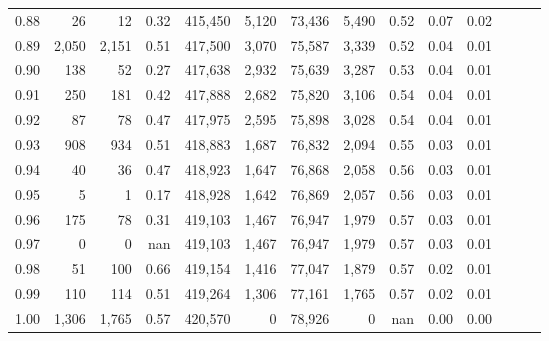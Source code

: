 \begin{tabular}{rrrrrrrrrrrrrr}
0.88 &      26 &     12 &  0.32 &  415,450 &    5,120 &  73,436 &   5,490 &  0.52 &  0.07 &      0.02 \\
0.89 &   2,050 &  2,151 &  0.51 &  417,500 &    3,070 &  75,587 &   3,339 &  0.52 &  0.04 &      0.01 \\
0.90 &     138 &     52 &  0.27 &  417,638 &    2,932 &  75,639 &   3,287 &  0.53 &  0.04 &      0.01 \\
0.91 &     250 &    181 &  0.42 &  417,888 &    2,682 &  75,820 &   3,106 &  0.54 &  0.04 &      0.01 \\
0.92 &      87 &     78 &  0.47 &  417,975 &    2,595 &  75,898 &   3,028 &  0.54 &  0.04 &      0.01 \\
0.93 &     908 &    934 &  0.51 &  418,883 &    1,687 &  76,832 &   2,094 &  0.55 &  0.03 &      0.01 \\
0.94 &      40 &     36 &  0.47 &  418,923 &    1,647 &  76,868 &   2,058 &  0.56 &  0.03 &      0.01 \\
0.95 &       5 &      1 &  0.17 &  418,928 &    1,642 &  76,869 &   2,057 &  0.56 &  0.03 &      0.01 \\
0.96 &     175 &     78 &  0.31 &  419,103 &    1,467 &  76,947 &   1,979 &  0.57 &  0.03 &      0.01 \\
0.97 &       0 &      0 &   nan &  419,103 &    1,467 &  76,947 &   1,979 &  0.57 &  0.03 &      0.01 \\
0.98 &      51 &    100 &  0.66 &  419,154 &    1,416 &  77,047 &   1,879 &  0.57 &  0.02 &      0.01 \\
0.99 &     110 &    114 &  0.51 &  419,264 &    1,306 &  77,161 &   1,765 &  0.57 &  0.02 &      0.01 \\
1.00 &   1,306 &  1,765 &  0.57 &  420,570 &        0 &  78,926 &       0 &   nan &  0.00 &      0.00 \\
\bottomrule
\end{tabular}
